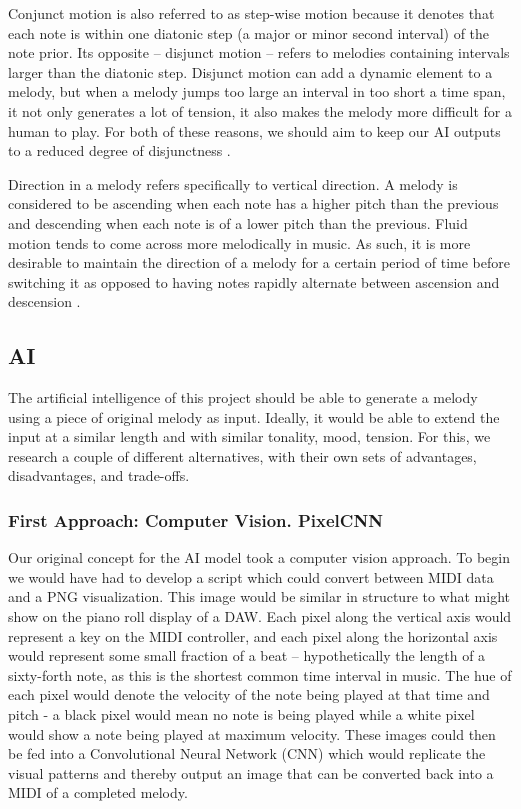 Conjunct motion is also referred to as step-wise motion because it denotes that each note is within
one diatonic step (a major or minor second interval) of the note prior. Its opposite -- disjunct
motion -- refers to melodies containing intervals larger than the diatonic step. Disjunct motion can
add a dynamic element to a melody, but when a melody jumps too large an interval in too short a
time span, it not only generates a lot of tension, it also makes the melody more difficult for a
human to play. For both of these reasons, we should aim to keep our AI outputs to a reduced degree
of disjunctness \autocite{contour}.

Direction in a melody refers specifically to vertical direction. A melody is considered to be
ascending when each note has a higher pitch than the previous and descending when each note is of a
lower pitch than the previous. Fluid motion tends to come across more melodically in music. As
such, it is more desirable to maintain the direction of a melody for a certain period of time
before switching it as opposed to having notes rapidly alternate between ascension and
descension \autocite{contour}.

\subsection{AI}

The artificial intelligence of this project should be able to generate a melody using
a piece of original melody as input. Ideally, it would be able to extend the input at a
similar length and with similar tonality, mood, tension. For this, we research
a couple of different alternatives, with their own sets of advantages, disadvantages, and
trade-offs.

\subsubsection{First Approach: Computer Vision. PixelCNN}

Our original concept for the AI model took a computer vision approach. To begin we would
have had to develop a script which could convert between MIDI data and a PNG
visualization. This image would be similar in structure to what might show on the piano
roll display of a DAW. Each pixel along the vertical axis would represent a key on the
MIDI controller, and each pixel along the horizontal axis would represent some small
fraction of a beat -- hypothetically the length of a sixty-forth note, as this is the
shortest common time interval in music. The hue of each pixel would denote the velocity
of the note being played at that time and pitch - a black pixel would mean no note is
being played while a white pixel would show a note being played at maximum velocity.
These images could then be fed into a Convolutional Neural Network (CNN) which would
replicate the visual patterns and thereby output an image that can be converted back into
a MIDI of a completed melody.

